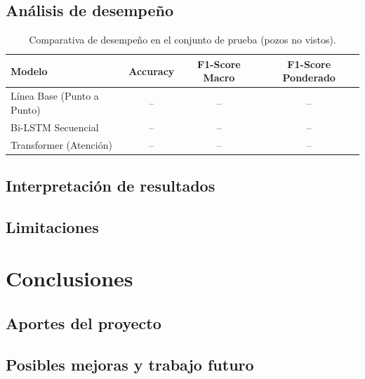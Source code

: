 \documentclass[11pt,a4paper]{article}
\begin{document}
\subsection{Análisis de desempeño}
\begin{table}[H]
\centering
\caption{Comparativa de desempeño en el conjunto de prueba (pozos no vistos).}
\label{tab:resultados}
\begin{tabular}{lccc}
\toprule
\textbf{Modelo} & \textbf{Accuracy} & \textbf{F1-Score Macro} & \textbf{F1-Score Ponderado} \\
\midrule
Línea Base (Punto a Punto) & -- & -- & -- \\
Bi-LSTM Secuencial & -- & -- & -- \\
Transformer (Atención) & -- & -- & -- \\
\bottomrule
\end{tabular}
\end{table}

\subsection{Interpretación de resultados}

\subsection{Limitaciones}


\section{Conclusiones}

\subsection{Aportes del proyecto}

\subsection{Posibles mejoras y trabajo futuro}

\printbibliography[heading=bibintoc,title={Referencias}]
\end{document}
